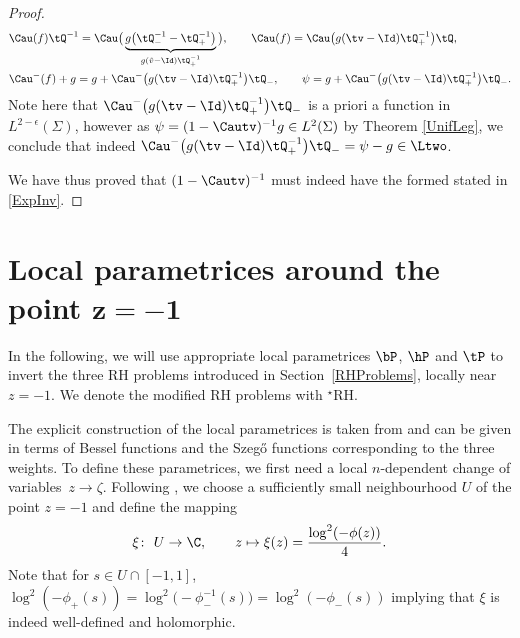 \begin{proof}
 \begin{align*}
& \Cau(f) \tQ^{-1} = \Cau\big(\underbrace{g\big(\tQ_-^{-1}-\tQ_+^{-1}\big)}_{g(\tilde v-\Id) \tQ_+^{-1}}\big),\qquad
 \Cau(f) = \Cau\big(g (\tv-\Id) \tQ_+^{-1}\big)\tQ,
 \\
& \Cau^-(f) + g = g + \Cau^{-}\big(g (\tv-\Id) \tQ_+^{-1}\big)\tQ_-,\qquad
 \psi = g + \Cau^-\big(g (\tv-\Id) \tQ_+^{-1}\big)\tQ_-.
\end{align*}
Note here that $\Cau^-\big(g (\tv-\Id) \tQ_+^{-1}\big)\tQ_-$ is a priori a function in $L^{2-\epsilon}(\Sigma)$, however as $\psi = (1-\Cautv)^{-1}g \in L^2(\Sigma)$ by Theorem \ref{UnifLeg}, we conclude that indeed $\Cau^-\big(g (\tv-\Id) \tQ_+^{-1}\big)\tQ_- = \psi - g \in \Ltwo$.

We have thus proved that $(1-\Cautv)^{-1}$ must indeed have the formed stated in \eqref{ExpInv}.
\end{proof}

\section[Local parametrices around the point z = -1]{Local parametrices around the point $\boldsymbol{z = -1}$}\label{LocPar}
In the following, we will use appropriate local parametrices $\bP$, $\hP$ and $\tP$ to invert the three RH problems introduced in Section~\ref{RHProblems}, locally near $z = -1$. We denote the modified RH problems with ${}^\star$RH.

The explicit construction of the local parametrices is taken from \cite[equation~(6.50)]{KMVV} and can be given in terms of Bessel functions and the Szeg\H{o} functions corresponding to the three weights. To define these parametrices, we first need a local $n$-dependent change of variables~$z\to\zeta$. Following \cite[Section~6]{KMVV}, we choose a sufficiently small neighbourhood $U$ of the point $z = -1$ and define the mapping
\begin{align}\label{defXi}
 \xi\colon\ U \to \C, \qquad z \mapsto \xi(z) = \frac{\log^2(-\phi(z))}{4}.
\end{align}
Note that for $s\in U\cap[-1,1]$, $
\log^2(-\phi_+(s)) = \log^2\bigl(-\phi^{-1}_-(s)\bigr) = \log^2(-\phi_-(s))$ implying that $\xi$ is indeed well-defined and holomorphic.


